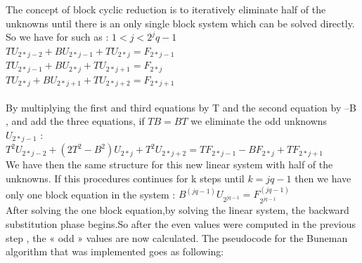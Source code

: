 The concept of block cyclic reduction is to iteratively eliminate half of the unknowns until there is an only single
block system which can be solved directly. 
So we have for such as : $1 < j < 2^jq -1$\\
$TU_{2*j-2} + BU_{2*j-1}+ TU_{2*j} = F_{2*j-1}$ \\
\hspace*{1cm} $TU_{2*j-1} + BU_{2*j}+ TU_{2*j+1} = F_{2*j}$ \\
\hspace*{2cm}$TU_{2*j} + BU_{2*j+1}+ TU_{2*j+2} = F_{2*j+1}$\\\\
By multiplying the first and third equations by T and the second equation by –B , and add the three equations, if $TB = BT$ we eliminate the odd unknowns $U_{2*j-1}$ :\\
$T^2U_{2*j-2} + (2T^2 - B^2)U_{2*j} + T^2U_{2*j+2} = TF_{2*j-1} -BF_{2*j} + TF_{2*j+1}$ \\
We have then the same structure for this new linear system with half of the unknowns. If this procedures continues for 
k steps until $k = jq-1$ then we have only one block equation in the system :
$B^{(jq-1)}U_{2^{jq-1}} = F^{(jq-1)}_{2^{jq-1}}$\\
After solving the one block equation,by solving the linear system, the backward substitution phase begins.So after the even values were computed in the previous step , the « odd » values are now calculated.
The pseudocode for the Buneman algorithm that was implemented goes as following: 
